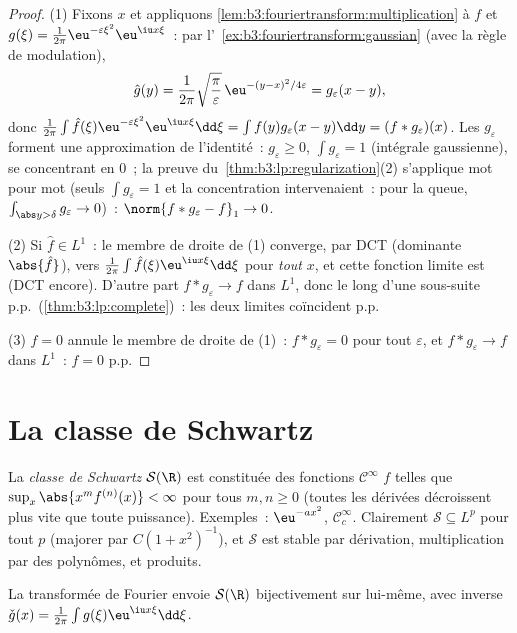 \begin{proof}
(1) Fixons $x$ et appliquons
\cref{lem:b3:fouriertransform:multiplication} à $f$ et
$g(\xi) = \frac1{2\pi}\eu^{-\varepsilon\xi^2}\eu^{\iu x\xi}$~:
par l'~\cref{ex:b3:fouriertransform:gaussian} (avec la règle de
modulation),
\[
\hat g(y) = \frac1{2\pi}\sqrt{\frac\pi\varepsilon}\,
\eu^{-(y - x)^2/4\varepsilon} = g_\varepsilon(x - y),
\]
donc $\frac1{2\pi}\int\hat f(\xi)\eu^{-\varepsilon\xi^2}
\eu^{\iu x\xi}\dd\xi = \int f(y)g_\varepsilon(x - y)\dd y =
(f*g_\varepsilon)(x)$. Les $g_\varepsilon$ forment une
approximation de l'identité~: $g_\varepsilon \geq 0$,
$\int g_\varepsilon = 1$ (intégrale gaussienne), se
concentrant en $0$~; la preuve du~\cref{thm:b3:lp:regularization}(2) s'applique mot pour mot
(seuls $\int g_\varepsilon = 1$ et la concentration
intervenaient~: pour la queue, $\int_{\abs y >
\delta}g_\varepsilon \to 0$)~: $\norm{f * g_\varepsilon -
f}_1 \to 0$.

(2) Si $\hat f \in L^1$~: le membre de droite de (1) converge,
par DCT (dominante $\abs{\hat f}$), vers
$\frac1{2\pi}\int\hat f(\xi)\eu^{\iu x\xi}\dd\xi$ pour
\emph{tout} $x$, et cette fonction limite est  (DCT
encore). D'autre part $f * g_\varepsilon \to f$ dans $L^1$,
donc le long d'une sous-suite p.p.\
(\cref{thm:b3:lp:complete})~: les deux limites coïncident
p.p.

(3) $\hat f = 0$ annule le membre de droite de (1)~: $f *
g_\varepsilon = 0$ pour tout $\varepsilon$, et $f *
g_\varepsilon \to f$ dans $L^1$~: $f = 0$ p.p.
\end{proof}

\section{La classe de Schwartz}

\begin{definition}\label{def:b3:fouriertransform:schwartz}
La \emph{classe de Schwartz}
$\mathcal S(\R)$ est constituée des fonctions $\mathcal
C^\infty$ $f$ telles que $\sup_x\abs{x^m f^{(n)}(x)} < \infty$
pour tous $m, n \geq 0$ (toutes les dérivées décroissent plus
vite que toute puissance). Exemples~: $\eu^{-ax^2}$,
$\mathcal C_c^\infty$. Clairement $\mathcal S \subseteq L^p$
pour tout $p$ (majorer par $C(1 + x^2)^{-1}$), et $\mathcal S$
est stable par dérivation, multiplication par des polynômes, et
produits.
\end{definition}

\begin{theorem}\label{thm:b3:fouriertransform:schwartz}
La transformée de Fourier envoie $\mathcal S(\R)$ bijectivement
sur lui-même, avec inverse $\check g(x) =
\frac1{2\pi}\int g(\xi)\eu^{\iu x\xi}\dd\xi$.
\end{theorem}

